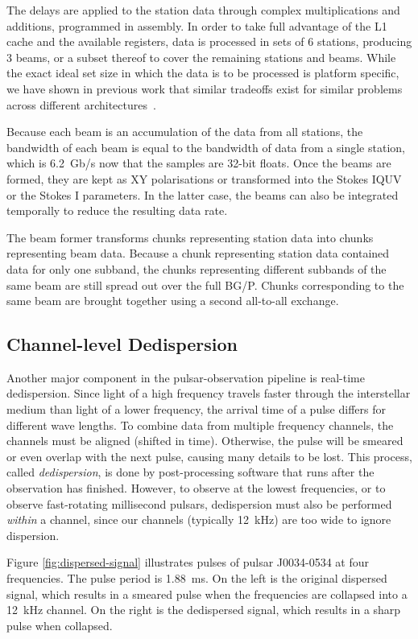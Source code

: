 \documentclass{llncs}
\begin{document}
The delays are applied to the station data through complex multiplications and additions, programmed in assembly. In order to take full advantage of the L1 cache and the available registers, data is processed in sets of 6 stations, producing 3 beams, or a subset thereof to cover the remaining stations and beams. While the exact ideal set size in which the data is to be processed is platform specific, we have shown in previous work that similar tradeoffs exist for similar problems across different architectures~\cite{Nieuwpoort:09}.

Because each beam is an accumulation of the data from all stations, the bandwidth of each beam is equal to the bandwidth of data from a single station, which is 6.2~Gb/s now that the samples are 32-bit floats. Once the beams are formed, they are kept as XY polarisations or transformed into the Stokes IQUV or the Stokes I parameters. In the latter case, the beams can also be integrated temporally to reduce the resulting data rate.

The beam former transforms chunks representing station data into chunks representing beam data. Because a chunk representing station data contained data for only one subband, the chunks representing different subbands of the same beam are still spread out over the full BG/P. Chunks corresponding to the same beam are brought together using a second all-to-all exchange.

\subsection{Channel-level Dedispersion}

Another major component in the pulsar-observation pipeline is real-time dedispersion.  Since light of a high frequency travels faster through the interstellar medium than light of a lower frequency, the arrival time of a pulse differs for different wave lengths. To combine data from multiple frequency channels, the channels must be aligned (shifted in time). Otherwise, the pulse will be smeared or even overlap with the next pulse, causing many details to be lost. This process, called \emph{dedispersion}, is done by post-processing software that runs after the observation has finished.  However, to observe at the lowest frequencies, or to observe fast-rotating millisecond pulsars, dedispersion must also be performed \emph{within\/} a channel, since our channels (typically 12~kHz) are too wide to ignore dispersion.

Figure \ref{fig:dispersed-signal} illustrates pulses of pulsar J0034-0534 at four frequencies. The pulse period is 1.88~ms. On the left is the original dispersed signal, which results in a smeared pulse when the frequencies are collapsed into a 12~kHz channel. On the right is the dedispersed signal, which results in a sharp pulse when collapsed.
\end{document}
